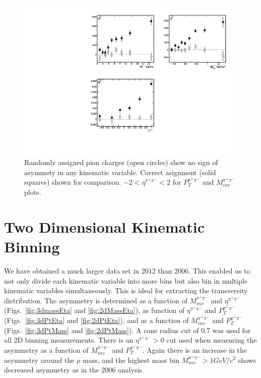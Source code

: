 \documentclass[letterpaper, abstract = on,listof=totoc, bibliography=totoc]{scrreprt}
\newcommand{\ptpair}{P_{T}^{\pi^+\pi^-}}
\newcommand{\mpair}{M_{inv}^{\pi^+\pi^-}}
\newcommand{\etapair}{\eta^{\pi^+\pi^-}}
\newcommand{\pip}{\pi^+}
\newcommand{\pim}{\pi^-}
\newcommand{\pair}{$\pip\pim$ }
\begin{document}
\begin{figure}
\begin{center}
\includegraphics[width = 1\textwidth]{randomCharge}
\caption[Asymmetry in \pair pair with randomly assigned charges]{Randomly assigned pion charges (open circles) show no sign of asymmety in any kinematic variable. Correct asignment (solid squares) shown for comparison. $-2<\etapair<2$ for $\ptpair$ and $\mpair$ plots.}
\label{fig:randomCharge}
\end{center}
\end{figure}

\section{Two Dimensional Kinematic Binning}
\label{sec:2dresults}

We have obtained a much larger data set in 2012 than 2006. This enabled us to not only divide each kinematic variable into more bins but also bin in multiple kinematic variables simultaneously. This is ideal for extracting the transversity distribution. The asymmetry is determined as a function of $\mpair$ and $\etapair$ (Figs.~\ref{fig:3dmassEta} and \ref{fig:2dMassEta}), as function of $\etapair$ and $\ptpair$ (Figs.~\ref{fig:3dPtEta} and \ref{fig:2dPtEta}), and as a function of $\mpair$ and $\ptpair$ (Figs.~\ref{fig:3dPtMass} and \ref{fig:2dPtMass}). A cone radius cut of 0.7 was used for all 2D binning measurements. There is an $\etapair > 0$ cut used when measuring the asymmetry as a function of $\mpair$ and $\ptpair$. Again there is an increase in the asymmetry around the $\rho$ mass, and the highest mass bin $\mpair > 1 GeV/c^2$ shows decreased asymmetry as in the 2006 analysis.  
\end{document}
